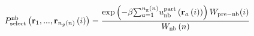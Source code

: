 \documentclass[12pt]{article}
\begin{document}
\begin{displaymath}
P_{\rm select}^{\rm nb}\left({\bf r}_{1},...,{\bf r}_{n_g(n)}\left(i\right)\right) = 
{
{
\exp\left(-\beta {\sum_{a=1}^{n_{\rm g}\left(n\right)}} u_{\rm nb}^{\rm part}\left({\bf r}_a\left(i\right)\right)\right)
{
W_{\rm pre-nb}(i)
}
}\over{
W_{\rm nb}\left(n\right)
}
}
\end{displaymath}
\end{document}
